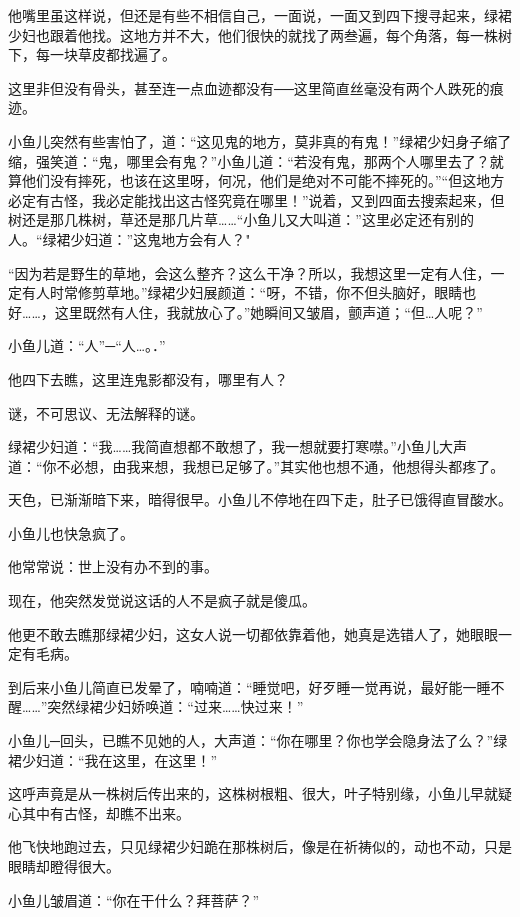 \documentclass[12pt,oneside]{book}
\begin{document}
他嘴里虽这样说，但还是有些不相信自己，一面说，一面又到四下搜寻起来，绿裙少妇也跟着他找。这地方并不大，他们很快的就找了两叁遍，每个角落，每一株树下，每一块草皮都找遍了。

这里非但没有骨头，甚至连一点血迹都没有──这里简直丝毫没有两个人跌死的痕迹。

小鱼儿突然有些害怕了，道：``这见鬼的地方，莫非真的有鬼！''绿裙少妇身子缩了缩，强笑道：``鬼，哪里会有鬼？''小鱼儿道：``若没有鬼，那两个人哪里去了？就算他们没有摔死，也该在这里呀，何况，他们是绝对不可能不摔死的。''``但这地方必定有古怪，我必定能找出这古怪究竟在哪里！''说着，又到四面去搜索起来，但树还是那几株树，草还是那几片草\ldots\ldots{}``小鱼儿又大叫道：''这里必定还有别的人。``绿裙少妇道：''这鬼地方会有人？"

``因为若是野生的草地，会这么整齐？这么干净？所以，我想这里一定有人住，一定有人时常修剪草地。''绿裙少妇展颜道：``呀，不错，你不但头脑好，眼睛也好\ldots\ldots，这里既然有人住，我就放心了。''她瞬间又皱眉，颤声道；``但\ldots 人呢？''

小鱼儿道：``人''─``人\ldots。．''

他四下去瞧，这里连鬼影都没有，哪里有人？

谜，不可思议、无法解释的谜。

绿裙少妇道：``我\ldots\ldots 我简直想都不敢想了，我一想就要打寒噤。''小鱼儿大声道：``你不必想，由我来想，我想已足够了。''其实他也想不通，他想得头都疼了。

天色，已渐渐暗下来，暗得很早。小鱼儿不停地在四下走，肚子已饿得直冒酸水。

小鱼儿也快急疯了。

他常常说：世上没有办不到的事。

现在，他突然发觉说这话的人不是疯子就是傻瓜。

他更不敢去瞧那绿裙少妇，这女人说一切都依靠着他，她真是选错人了，她眼眼一定有毛病。

到后来小鱼儿简直已发晕了，喃喃道：``睡觉吧，好歹睡一觉再说，最好能一睡不醒\ldots\ldots{}''突然绿裙少妇娇唤道：``过来\ldots\ldots 快过来！''

小鱼儿─回头，已瞧不见她的人，大声道：``你在哪里？你也学会隐身法了么？''绿裙少妇道：``我在这里，在这里！''

这呼声竟是从一株树后传出来的，这株树根粗、很大，叶子特别缘，小鱼儿早就疑心其中有古怪，却瞧不出来。

他飞快地跑过去，只见绿裙少妇跪在那株树后，像是在祈祷似的，动也不动，只是眼睛却瞪得很大。

小鱼儿皱眉道：``你在干什么？拜菩萨？''
\end{document}
